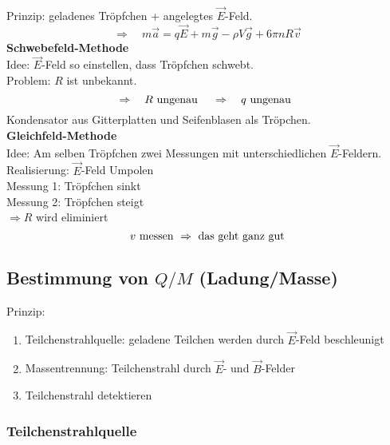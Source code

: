 \\
Prinzip: geladenes Tröpfchen + angelegtes $ \vec{E} $-Feld.
\begin{equation*}
\Rightarrow \quad m \vec{a} = q \vec{E} + m \vec{g} - \rho V \vec{g} + 6 \pi n R \vec{v}
\end{equation*}
\textbf{Schwebefeld-Methode}\\
Idee: $ \vec{E} $-Feld so einstellen, dass Tröpfchen schwebt.\\
Problem: $ R $ ist unbekannt.
\begin{equation*}
\Rightarrow \quad R \textrm{ ungenau } \quad \Rightarrow \quad q \textrm{ ungenau }
\end{equation*}
Kondensator aus Gitterplatten und Seifenblasen als Tröpchen.\\[5pt]
\textbf{Gleichfeld-Methode}\\
Idee: Am selben Tröpfchen zwei Messungen mit unterschiedlichen $ \vec{E} $-Feldern.\\
Realisierung: $ \vec{E} $-Feld Umpolen\\[5pt]
Messung 1: Tröpfchen sinkt\\
Messung 2: Tröpfchen steigt\\
$ \Rightarrow R $ wird eliminiert
\begin{equation*}
v \textrm{ messen } \Rightarrow \textrm{ das geht ganz gut}
\end{equation*}

\subsection{Bestimmung von \texorpdfstring{$ Q / M $}{Q/M} (Ladung/Masse)}

Prinzip:
\begin{enumerate}[1)]
	\item Teilchenstrahlquelle: geladene Teilchen werden durch $ \vec{E} $-Feld beschleunigt
	\item Massentrennung: Teilchenstrahl durch $ \vec{E} $- und $ \vec{B} $-Felder
	\item Teilchenstrahl detektieren
\end{enumerate}

\subsubsection{Teilchenstrahlquelle}

